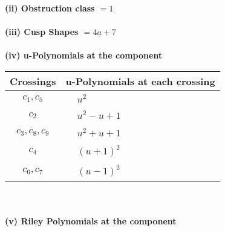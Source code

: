 \documentclass[1p]{elsarticle_modified}
\theoremstyle{definition}
\begin{document}
\flushleft \textbf{(ii) Obstruction class $= 1$}\\~\\
\flushleft \textbf{(iii) Cusp Shapes $= 4 a+7$}\\~\\
\newpage\renewcommand{\arraystretch}{1}
\flushleft \textbf{(iv) u-Polynomials at the component}\newline \\
\begin{tabular}{m{50pt}|m{274pt}}
Crossings & \hspace{64pt}u-Polynomials at each crossing \\
\hline $$\begin{aligned}c_{1},c_{5}\end{aligned}$$&$\begin{aligned}
&u^2
\end{aligned}$\\
\hline $$\begin{aligned}c_{2}\end{aligned}$$&$\begin{aligned}
&u^2- u+1
\end{aligned}$\\
\hline $$\begin{aligned}c_{3},c_{8},c_{9}\end{aligned}$$&$\begin{aligned}
&u^2+u+1
\end{aligned}$\\
\hline $$\begin{aligned}c_{4}\end{aligned}$$&$\begin{aligned}
&(u+1)^2
\end{aligned}$\\
\hline $$\begin{aligned}c_{6},c_{7}\end{aligned}$$&$\begin{aligned}
&(u-1)^2
\end{aligned}$\\
\hline
\end{tabular}\\~\\
\newpage\renewcommand{\arraystretch}{1}
\flushleft \textbf{(v) Riley Polynomials at the component}\newline \\
\end{document}

